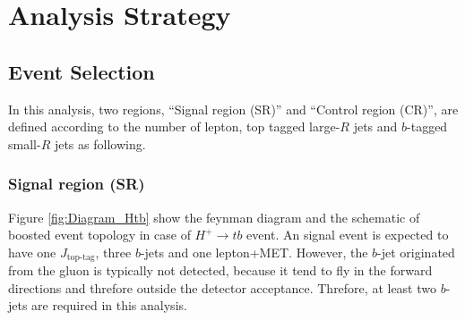\section{Analysis Strategy}
\label{sec:AnalysisStrategy}

\subsection{Event Selection}
\label{subsec:EventSelection}
In this analysis, two regions, ``Signal region (SR)'' and ``Control region (CR)'', are defined according to the number of lepton, top tagged large-$R$ jets and $b$-tagged small-$R$ jets as following.

\subsubsection{Signal region (SR)}
\label{subsec:EventSelection_SR}
Figure \ref{fig:Diagram_Htb} show the feynman diagram and the schematic of boosted event topology in case of $H^{+}{\rightarrow}tb$ event. An signal event is expected to have one $J_{\text{top-tag}}$, three $b$-jets and one lepton+MET. However, the $b$-jet originated from the gluon is typically not detected, because it tend to fly in the forward directions and threfore outside the detector acceptance. Threfore, at least two $b$-jets are required in this analysis.

